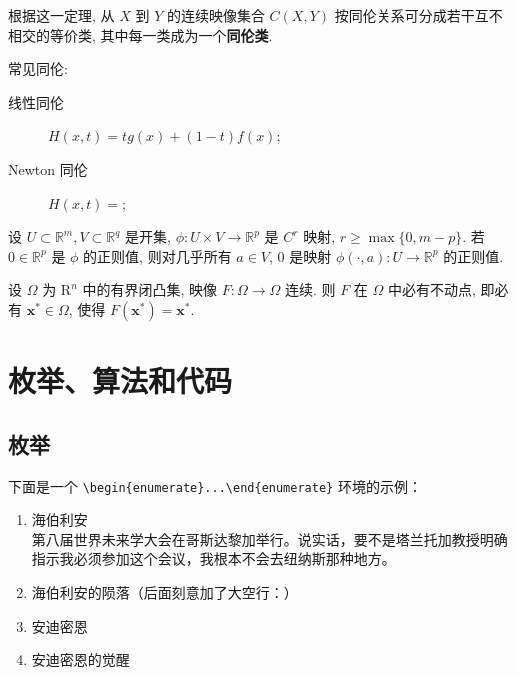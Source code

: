 \documentclass[12]{ctexart}
\begin{document}
根据这一定理, 从 \(X\) 到 \(Y\) 的连续映像集合 \(C(X,Y)\) 按同伦关系可分成若干互不相交的等价类, 其中每一类成为一个\textbf{同伦类}.

常见同伦:
\begin{description}
  \item[线性同伦] \(H(x,t)=tg(x)+(1-t)f(x)\);
  \item[Newton 同伦] \(H(x,t)=\);
\end{description}

\begin{theorem}
设 \(U\subset\mathbb{R}^m,V\subset\mathbb{R}^q\) 是开集, \(\phi:U\times V\to\mathbb{R}^p\) 是 \(C^r\) 映射, \(r\ge\max\lbrace 0,m-p\rbrace\). 若 \(0\in\mathbb{R}^p\) 是 \(\phi\) 的正则值, 则对几乎所有 \(a\in V\), \(0\) 是映射 \(\phi(\cdot,a):U\to\mathbb{R}^p\) 的正则值.
\end{theorem}

\begin{corollary}
设 \(\Omega\) 为 \(\mathrm{R}^n\) 中的有界闭凸集, 映像 \(F:\Omega\to \Omega\) 连续. 则 \(F\) 在 \(\Omega\) 中必有不动点, 即必有 \(\boldsymbol{x}^*\in \Omega\), 使得 \(F \left(\boldsymbol{x}^*\right)=\boldsymbol{x}^*\).
\end{corollary}

\section{枚举、算法和代码}\label{sec_enum_algo_code}


\subsection{枚举}

下面是一个 \verb|\begin{enumerate}...\end{enumerate}| 环境的示例：

\begin{enumerate}
    \item 海伯利安\\
    第八届世界未来学大会在哥斯达黎加举行。说实话，要不是塔兰托加教授明确指示我必须参加这个会议，我根本不会去纽纳斯那种地方。

    \item 海伯利安的陨落（后面刻意加了大空行：）\\

    \item 安迪密恩

    \item 安迪密恩的觉醒

\end{enumerate}
\end{document}
